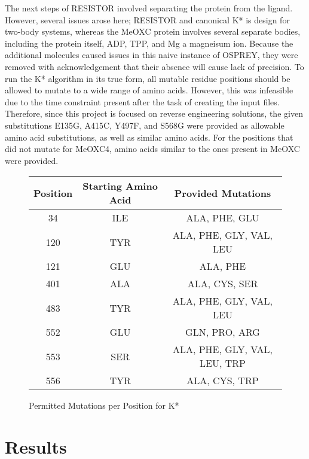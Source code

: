 \documentclass[12pt]{extarticle}
\begin{document}
\indent The next steps of RESISTOR involved separating the protein from the ligand. However, several issues arose here; RESISTOR and canonical K* is design for two-body systems, whereas the MeOXC protein involves several separate bodies, including the protein itself, ADP, TPP, and Mg a magneisum ion. Because the additional molecules caused issues in this naive instance of OSPREY, they were removed with acknowledgement that their absence will cause lack of precision. To run the K* algorithm in its true form, all mutable residue positions should be allowed to mutate to a wide range of amino acids. However, this was infeasible due to the time constraint present after the task of creating the input files. Therefore, since this project is focused on reverse engineering solutions, the given substitutions E135G, A415C, Y497F, and S568G were provided as allowable amino acid substitutions, as well as similar amino acids. For the positions that did not mutate for MeOXC4, amino acids similar to the ones present in MeOXC were provided.\\
\begin{figure}
\begin{center}
\begin{tabular}{||c c c||} 
 \hline
 Position & Starting Amino Acid & Provided Mutations \\
 \hline\hline
 34 & ILE & ALA, PHE, GLU \\ 
 \hline
 120 & TYR & ALA, PHE, GLY, VAL, LEU \\
 \hline
 121 & GLU & ALA, PHE \\
 \hline
 401 & ALA & ALA, CYS, SER \\
 \hline
 483 & TYR & ALA, PHE, GLY, VAL, LEU \\ 
 \hline
 552 & GLU & GLN, PRO, ARG \\
 \hline
 553 & SER & ALA, PHE, GLY, VAL, LEU, TRP \\ 
 \hline
 556 & TYR & ALA, CYS, TRP\\  
 \hline
\end{tabular}
\end{center}
\caption{Permitted Mutations per Position for K*}
 \label{fig:my_label}
\end{figure}

\section{Results}
\end{document}
